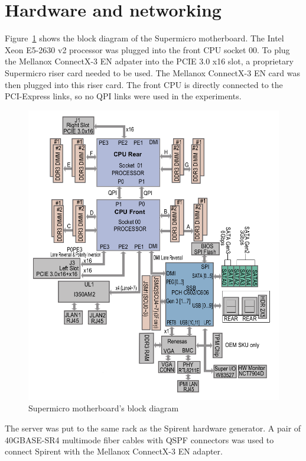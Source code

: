 
\section{Hardware and networking}\label{sec:setup-hardware}
Figure~\ref{fig:setup-supermicro-board} shows the block diagram of the Supermicro motherboard.
The Intel Xeon E5-2630 v2 processor was plugged into the front CPU socket 00.
To plug the Mellanox ConnectX-3 EN adpater into the PCIE 3.0 x16 slot,
a proprietary Supermicro riser card needed to be used.
The Mellanox ConnectX-3 EN card was then plugged into this riser card.
The front CPU is directly connected to the PCI-Express links, so no QPI links were used in the experiments.
\begin{figure}
	\centering
	\includegraphics[width=14.5cm,keepaspectratio]{fig/supermicro-board.png}
	\caption{Supermicro motherboard's block diagram}
	\label{fig:setup-supermicro-board}
\end{figure}

The server was put to the same rack as the Spirent hardware generator.
A pair of 40GBASE-SR4 multimode fiber cables with QSPF connectors
was used to connect Spirent with the Mellanox ConnectX-3 EN adapter.

